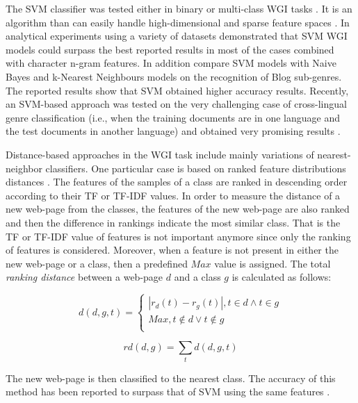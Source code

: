 The SVM classifier was tested either in binary or multi-class WGI tasks \parencite{dai2018fine}. It is an algorithm than can easily handle high-dimensional and sparse feature spaces \parencite{joachims1997probabilistic}. In \parencite{sharoff2010web} analytical experiments using a variety of datasets demonstrated that SVM WGI models could surpass the best reported results in most of the cases combined with character n-gram features. In addition \parencite{virik2017blog} compare SVM models with Naive Bayes and k-Nearest Neighbours models on the recognition of Blog sub-genres. The reported results show that SVM obtained higher accuracy results. Recently, an SVM-based approach was tested on the very challenging case of cross-lingual genre classification (i.e., when the training documents are in one language and the test documents in another language) and obtained very promising results \parencite{nguyen2019cross}. 

Distance-based approaches in the WGI task include mainly variations of nearest-neighbor classifiers. One particular case is based on ranked feature distributions distances \parencite{waltinger2010feature}. The features of the samples of a class are ranked in descending order according to their TF or TF-IDF values. In order to measure the distance of a new web-page from the classes, the features of the new web-page are also ranked and then the difference in rankings indicate the most similar class. That is the TF or TF-IDF value of features is not important anymore since only the ranking of features is considered. Moreover, when a feature is not present in either the new web-page or a class, then a predefined $Max$ value is assigned. The total \textit{ranking distance} between a web-page $d$ and a class $g$ is calculated as follows:

\begin{equation}\label{eq:ranking_distance}
	d(d,g,t) =
      \begin{cases}
      	| r_{d}(t) - r_{g}(t) |, t \in d \wedge t \in g  \\
        Max, t \notin d \vee t \notin g \\ 
       \end{cases}
\end{equation}

\begin{equation}\label{eq:ranking_distance_sum}
	rd(d,g) = \sum_{t} d(d,g,t)
\end{equation}

The new web-page is then classified to the nearest class. The accuracy of this method has been reported to surpass that of SVM using the same features \parencite{waltinger2010feature}.

